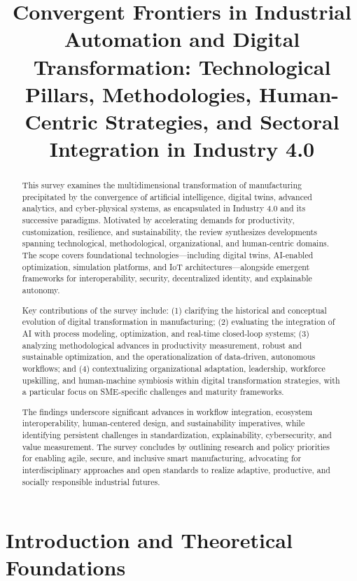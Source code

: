 \title{Convergent Frontiers in Industrial Automation and Digital Transformation: Technological Pillars, Methodologies, Human-Centric Strategies, and Sectoral Integration in Industry 4.0}
\maketitle

\begin{abstract}
This survey examines the multidimensional transformation of manufacturing precipitated by the convergence of artificial intelligence, digital twins, advanced analytics, and cyber-physical systems, as encapsulated in Industry 4.0 and its successive paradigms. Motivated by accelerating demands for productivity, customization, resilience, and sustainability, the review synthesizes developments spanning technological, methodological, organizational, and human-centric domains. The scope covers foundational technologies—including digital twins, AI-enabled optimization, simulation platforms, and IoT architectures—alongside emergent frameworks for interoperability, security, decentralized identity, and explainable autonomy.

Key contributions of the survey include: (1) clarifying the historical and conceptual evolution of digital transformation in manufacturing; (2) evaluating the integration of AI with process modeling, optimization, and real-time closed-loop systems; (3) analyzing methodological advances in productivity measurement, robust and sustainable optimization, and the operationalization of data-driven, autonomous workflows; and (4) contextualizing organizational adaptation, leadership, workforce upskilling, and human-machine symbiosis within digital transformation strategies, with a particular focus on SME-specific challenges and maturity frameworks.

The findings underscore significant advances in workflow integration, ecosystem interoperability, human-centered design, and sustainability imperatives, while identifying persistent challenges in standardization, explainability, cybersecurity, and value measurement. The survey concludes by outlining research and policy priorities for enabling agile, secure, and inclusive smart manufacturing, advocating for interdisciplinary approaches and open standards to realize adaptive, productive, and socially responsible industrial futures.
\end{abstract}

\section{Introduction and Theoretical Foundations}

